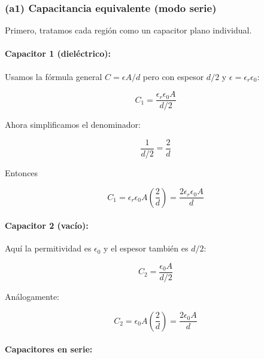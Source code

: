 \documentclass{article}
\begin{document}
\subsubsection*{(a1) Capacitancia equivalente (modo serie)}

Primero, tratamos cada región como un capacitor plano individual.

\paragraph{Capacitor 1 (dieléctrico):}

Usamos la fórmula general $C = \epsilon A / d$ pero con espesor $d/2$ y $\epsilon = \epsilon_{r}\epsilon_{0}$:

\begin{equation}
C_{1} = \frac{\epsilon_{r}\epsilon_{0}A}{d/2}
\label{eq:C1-a-raw}
\end{equation}

Ahora simplificamos el denominador:

\[
\frac{1}{d/2} = \frac{2}{d}
\]

Entonces

\begin{equation}
C_{1} 
= \epsilon_{r}\epsilon_{0}A\left(\frac{2}{d}\right)
= \frac{2\epsilon_{r}\epsilon_{0}A}{d}
\label{eq:C1-a}
\end{equation}

\paragraph{Capacitor 2 (vacío):}

Aquí la permitividad es $\epsilon_{0}$ y el espesor también es $d/2$:

\begin{equation}
C_{2} = \frac{\epsilon_{0}A}{d/2}
\label{eq:C2-a-raw}
\end{equation}

Análogamente:

\begin{equation}
C_{2} 
= \epsilon_{0}A\left(\frac{2}{d}\right)
= \frac{2\epsilon_{0}A}{d}
\label{eq:C2-a}
\end{equation}

\paragraph{Capacitores en serie:}
\end{document}
